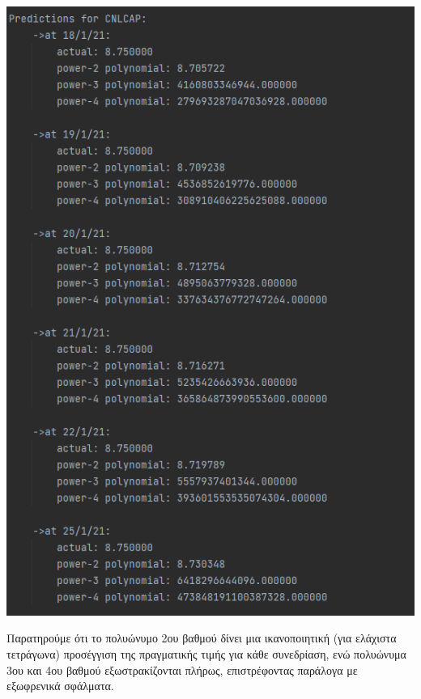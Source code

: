 \documentclass{article}
\newcommand{\gt}{\greektext}
\begin{document}
\begin{center}
    \includegraphics[scale=0.7]{images/cnlcap_future.png}
\end{center}
\gt Παρατηρούμε ότι το πολυώνυμο 2ου βαθμού δίνει μια ικανοποιητική
\gt(για ελάχιστα τετράγωνα) προσέγγιση της πραγματικής τιμής για κάθε συνεδρίαση, ενώ
 πολυώνυμα 3ου και 4ου βαθμού εξωστρακίζονται πλήρως, επιστρέφοντας παράλογα
 με εξωφρενικά σφάλματα.
\end{document}

